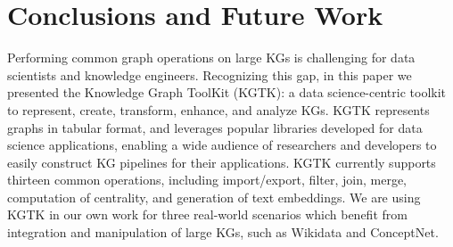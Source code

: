 \documentclass[runningheads]{llncs}
\newcommand{\kibitz}[2]{%
{\color{#1}#2}{}%
}
\newcommand{\filip}[1]{\kibitz{purple}{[FI:#1]}} %
\begin{document}











\section{Conclusions and Future Work}\label{sec:conclusions}

Performing common graph operations on large KGs is challenging for data scientists and knowledge engineers. Recognizing this gap, in this paper we presented the Knowledge Graph ToolKit (KGTK): a data science-centric toolkit to represent, create, transform, enhance, and analyze KGs. KGTK represents graphs in tabular format, and leverages popular libraries developed for data science applications, enabling a wide audience of researchers and developers to easily construct KG pipelines for their applications. KGTK currently supports thirteen common operations, including import/export, filter, join, merge, computation of centrality, and generation of text embeddings. We are using KGTK in our own work for three real-world scenarios which benefit from integration and manipulation of large KGs, such as Wikidata and ConceptNet.%
\end{document}
